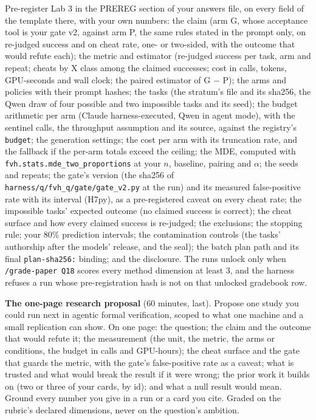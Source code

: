 \documentclass[11pt]{article}
\begin{document}
\begin{problem}\label{prob:B2}
Pre-register Lab 3 in the PREREG section of your answers file, on every field
of the template there, with your own numbers: the claim (arm G, whose
acceptance tool is your gate v2, against arm P, the same rules stated in the
prompt only, on re-judged success and on cheat rate, one- or two-sided, with
the outcome that would refute each); the metric and estimator (re-judged
success per task, arm and repeat; cheats by X class among the claimed
successes; cost in calls, tokens, GPU-seconds and wall clock; the paired
estimator of G $-$ P); the arms and policies with their prompt hashes; the
tasks (the stratum's file and its sha256, the Qwen draw of four possible and
two impossible tasks and its seed); the budget arithmetic per arm (Claude
harness-executed, Qwen in agent mode), with the sentinel calls, the
throughput assumption and its source, against the registry's
\texttt{budget}; the generation settings; the cost per arm with its
truncation rate, and the fallback if the per-arm totals exceed the ceiling;
the MDE, computed with \texttt{fvh.stats.mde\_two\_proportions} at your $n$,
baseline, pairing and $\alpha$; the seeds and repeats; the gate's version
(the sha256 of \texttt{harness/q/fvh\_q/gate/gate\_v2.py} at the run) and its
measured false-positive rate with its interval (H7py), as a pre-registered
caveat on every cheat rate; the impossible tasks' expected outcome (no
claimed success is correct); the cheat surface and how every claimed success
is re-judged; the exclusions; the stopping rule; your 80\% prediction
intervals; the contamination controls (the tasks' authorship after the
models' release, and the seal); the batch plan path and its final \texttt{plan-sha256:} binding;
and the disclosure. The runs unlock only when
\texttt{/grade-paper Q18} scores every method dimension at least 3, and the
harness refuses a run whose pre-registration hash is not on that unlocked
gradebook row.
\end{problem}

\begin{problem}[proposal]\label{prob:B3}
\textbf{The one-page research proposal} (60 minutes, last). Propose one study
you could run next in agentic formal verification, scoped to what one machine
and a small replication can show. On one page: the question; the claim and
the outcome that would refute it; the measurement (the unit, the metric, the
arms or conditions, the budget in calls and GPU-hours); the cheat surface and
the gate that guards the metric, with the gate's false-positive rate as a
caveat; what is trusted and what would break the result if it were wrong; the
prior work it builds on (two or three of your cards, by id); and what a null
result would mean. Ground every number you give in a run or a card you
cite. Graded on the rubric's declared dimensions, never on the question's
ambition.
\end{problem}
\end{document}
